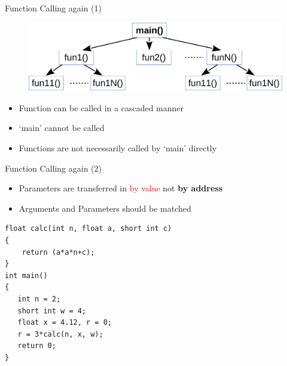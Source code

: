 \begin{frame}[fragile]{Function Calling again (1)}
\begin{figure}
	\includegraphics[width=0.8\linewidth]{figs/func_call.pdf}
\end{figure}
\begin{itemize}
	\item {Function can be called in a cascaded manner}
	\item {`main' cannot be called}
	\item {Functions are not necessarily called by `main' directly}
\end{itemize}
\end{frame}

\begin{frame}[fragile]{Function Calling again (2)}
\begin{itemize}
	\item {Parameters are transferred in \textcolor{red}{by value} not \textbf{by address}}
	\item {Arguments and Parameters should be matched}
\end{itemize}
\begin{lstlisting}
float calc(int n, float a, short int c)
{
    return (a*a*n+c);
}
int main()
{
   int n = 2;
   short int w = 4;
   float x = 4.12, r = 0;
   r = 3*calc(n, x, w);
   return 0;
}
\end{lstlisting}
\end{frame}
